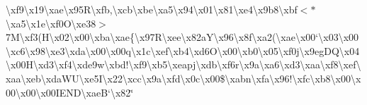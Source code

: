 \begin{DoxyCompactItemize}
\textbackslash{}xf9\textbackslash{}x19\textbackslash{}xae\textbackslash{}x95\+R\textbackslash{}xfb,\textbackslash{}xcb\textbackslash{}xbe\textbackslash{}xa5\textbackslash{}x94\textbackslash{}x01\textbackslash{}x81\textbackslash{}xe4\textbackslash{}x9b8\textbackslash{}xbf$<$$\ast$\textbackslash{}xa5\textbackslash{}x1e\textbackslash{}xf0\+O\textbackslash{}xe38$>$7\+M\textbackslash{}xf3(\+H\textbackslash{}x02\textbackslash{}x00\textbackslash{}xba\textbackslash{}xae\{\textbackslash{}x97\+R\textbackslash{}xee\textbackslash{}x82a\+Y\textbackslash{}x96\textbackslash{}x8f\textbackslash{}xa2(\textbackslash{}xae\textbackslash{}x00`\textbackslash{}x03\textbackslash{}x00\textbackslash{}xc6\textbackslash{}x98\textbackslash{}xe3\textbackslash{}xda\textbackslash{}x00\textbackslash{}x00q\textbackslash{}x1c\textbackslash{}xef\textbackslash{}xb4\textbackslash{}xd6\+O\textbackslash{}x00\textbackslash{}xb0\textbackslash{}x05\textbackslash{}xf0\textquotesingle{}j\textbackslash{}x9eg\+D\+Q\textbackslash{}x04\textbackslash{}x00\+H\textbackslash{}xd3\textbackslash{}xf4\textbackslash{}xde9w\textbackslash{}xbd!\textbackslash{}xf9\textbackslash{}xb5\textbackslash{}xeapj\textbackslash{}xdb\textbackslash{}xf6r\textbackslash{}x9a\textbackslash{}xa6\textbackslash{}xd3\textbackslash{}xaa\textbackslash{}xf8\textbackslash{}xef\textbackslash{}xaa\textbackslash{}xeb\textbackslash{}xda\+W\+U\textbackslash{}xe5\+I\textbackslash{}x22\textbackslash{}xcc\textbackslash{}x9a\textbackslash{}xfd\textbackslash{}x0c\textbackslash{}x00\$\textbackslash{}xabn\textbackslash{}xfa\textbackslash{}x96!\textbackslash{}xfc\textbackslash{}xb8\textbackslash{}x00\textbackslash{}x00\textbackslash{}x00\textbackslash{}x00\+I\+E\+N\+D\textbackslash{}xae\+B`\textbackslash{}x82\char`\"{}
\item 
$$
\end{DoxyCompactItemize}
